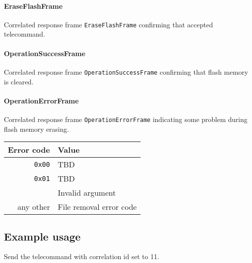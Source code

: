 \paragraph{EraseFlashFrame}
Correlated response frame \texttt{EraseFlashFrame} confirming that \obc accepted telecommand.

\paragraph{OperationSuccessFrame}
Correlated response frame \texttt{OperationSuccessFrame} confirming that flash memory is cleared.

\paragraph{OperationErrorFrame}
Correlated response frame \texttt{OperationErrorFrame} indicating some problem during flash memory erasing.


\begin{tabular}{r | l}
    Error code & Value \\
    \hline
    \texttt{0x00}   & TBD \\
    \texttt{0x01}   & TBD \\
                    & Invalid argument \\
    any other & File removal error code \\
\end{tabular}


\subsection{Example usage}
Send the telecommand with correlation id set to 11.

